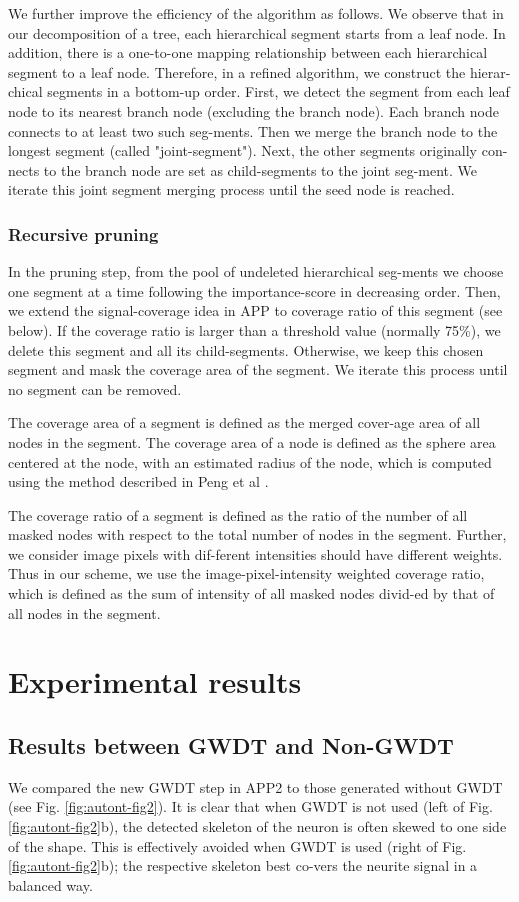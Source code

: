 We further improve the efficiency of the algorithm as follows. We observe that in our decomposition of a tree, each hierarchical segment starts from a leaf node. In addition, there is a one-to-one mapping relationship between each hierarchical segment to a leaf node. Therefore, in a refined algorithm, we construct the hierar-chical segments in a bottom-up order. First, we detect the segment from each leaf node to its nearest branch node (excluding the branch node). Each branch node connects to at least two such seg-ments. Then we merge the branch node to the longest segment (called "joint-segment"). Next, the other segments originally con-nects to the branch node are set as child-segments to the joint seg-ment. We iterate this joint segment merging process until the seed node is reached. 
\subsubsection{Recursive pruning}
In the pruning step, from the pool of undeleted hierarchical seg-ments we choose one segment at a time following the importance-score in decreasing order. Then, we extend the signal-coverage idea in APP to coverage ratio of this segment (see below). If the coverage ratio is larger than a threshold value (normally 75\%), we delete this segment and all its child-segments. Otherwise, we keep this chosen segment and mask the coverage area of the segment. We iterate this process until no segment can be removed.

The coverage area of a segment is defined as the merged cover-age area of all nodes in the segment. The coverage area of a node is defined as the sphere area centered at the node, with an estimated radius of the node, which is computed using the method described in Peng et al \cite{peng2010v3d,peng2010automatic}.

The coverage ratio of a segment is defined as the ratio of the number of all masked nodes with respect to the total number of nodes in the segment. Further, we consider image pixels with dif-ferent intensities should have different weights. Thus in our scheme, we use the image-pixel-intensity weighted coverage ratio, which is defined as the sum of intensity of all masked nodes divid-ed by that of all nodes in the segment.
\section{Experimental results}
\subsection{Results between GWDT and Non-GWDT}
We compared the new GWDT step in APP2 to those generated without GWDT (see Fig. \ref{fig:autont-fig2}). It is clear that when GWDT is not used (left of Fig. \ref{fig:autont-fig2}b), the detected skeleton of the neuron is often skewed to one side of the shape. This is effectively avoided when GWDT is used (right of Fig. \ref{fig:autont-fig2}b); the respective skeleton best co-vers the neurite signal in a balanced way.

